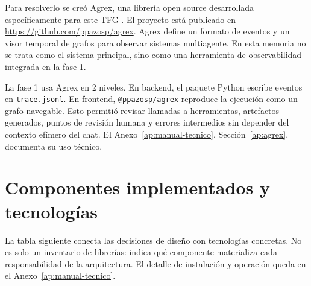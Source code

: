 Para resolverlo se creó Agrex, una librería open source desarrollada
específicamente para este TFG \cite{pazos2026agrex}. El proyecto está publicado
en \url{https://github.com/ppazosp/agrex}. Agrex define un formato de eventos y
un visor temporal de grafos para observar sistemas multiagente. En esta memoria
no se trata como el sistema principal, sino como una herramienta de
observabilidad integrada en la fase 1.

La fase 1 usa Agrex en 2 niveles. En backend, el paquete Python escribe eventos
en \texttt{trace.jsonl}. En frontend, \texttt{@ppazosp/agrex} reproduce la
ejecución como un grafo navegable. Esto permitió revisar llamadas a
herramientas, artefactos generados, puntos de revisión humana y errores
intermedios sin depender del contexto efímero del chat. El
Anexo~\ref{ap:manual-tecnico}, Sección~\ref{ap:agrex}, documenta su uso técnico.

\section{Componentes implementados y tecnologías}

La tabla siguiente conecta las decisiones de diseño con tecnologías concretas.
No es solo un inventario de librerías: indica qué componente materializa cada
responsabilidad de la arquitectura. El detalle de instalación y operación queda
en el Anexo~\ref{ap:manual-tecnico}.

